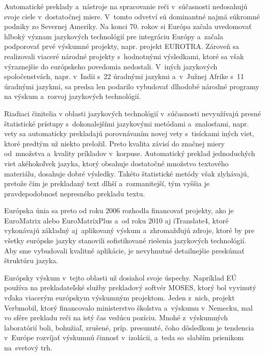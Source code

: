 Automatické preklady a~nástroje na spracovanie reči v~súčasnosti nedosahujú svoje ciele v~dostatočnej miere. V~tomto odvetví sú dominantné najmä súkromné podniky zo Severnej Ameriky. Na konci 70. rokov si Európa začala uvedomovať hlboký význam jazykových technológií pre integráciu Európy a~začala podporovať prvé výskumné projekty, napr. projekt EUROTRA. Zároveň sa realizovali viaceré národné projekty s~hodnotnými výsledkami, ktoré sa však výraznejšie do európskeho povedomia nedostali. V~iných jazykových spoločenstvách, napr. v~Indii s~22 úradnými jazykmi a~v~Južnej Afrike s~11 úradnými jazykmi, sa predsa len podarilo vybudovať dlhodobé národné programy na výskum a~rozvoj jazykových technológií.

Riadiaci činitelia v oblasti jazykových technológií v~súčasnosti nevyužívajú presné štatistické prístupy s~dokonalejšími jazykovými metódami a~znalosťami, napr. vety sa automaticky prekladajú porovnávaním novej vety s~tisíckami iných viet, ktoré predtým už niekto preložil. Preto kvalita závisí do značnej miery od~množstva a~kvality príkladov v~korpuse. Automatický preklad jednoduchých viet akéhokoľvek jazyka, ktorý obsahuje dostatočné množstvo textového materiálu, dosahuje dobré výsledky. Takéto štatistické metódy však zlyhávajú, pretože čím je prekladaný text dlhší a~rozmanitejší, tým vyššia je pravdepodobnosť nepresného prekladu textu. 

Európska únia sa preto od roku 2006 rozhodla financovať projekty, ako je EuroMatrix alebo EuroMatrixPlus a~od roku 2010 aj iTranslate4, ktoré vykonávajú základný aj~aplikovaný výskum a~zhromažďujú zdroje, ktoré by pre všetky európske jazyky stanovili sofistikované riešenia jazykových technológií. Aby sme vybudovali kvalitné aplikácie, je nevyhnutné detailnejšie preskúmať štruktúru jazyka.

Európsky výskum v~tejto oblasti už dosiahol svoje úspechy. Napríklad EÚ používa na prekladateľské služby prekladový softvér MOSES, ktorý bol vyvinutý vďaka viacerým európskym výskumným projektom. Jeden z~nich, projekt Verbmobil, ktorý financovalo ministerstvo školstva a~výskumu v~Nemecku, mal vo sfére prekladu reči na istý čas vedúcu pozíciu. Mnohé z~výskumných laboratórií boli, bohužiaľ, zrušené, príp. presunuté, čoho dôsledkom je tendencia v~Európe rozvíjať výskumnú činnosť v~izolácii, a~teda so~slabším prienikom na~svetový trh.
